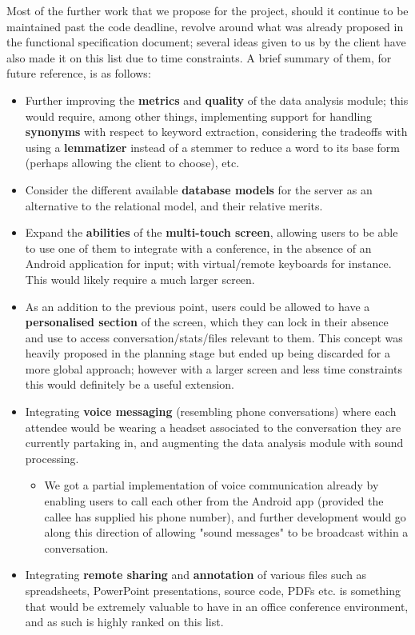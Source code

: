 \documentclass[12p, a4paper, onecolumn]{report}
\begin{document}
Most of the further work that we propose for the project, should it continue to be maintained past the code deadline, revolve around what was already proposed in the functional specification document; several ideas given to us by the client have also made it on this list due to time constraints. A brief summary of them, for future reference, is as follows:
\begin{itemize}
	\item Further improving the \textbf{metrics} and \textbf{quality} of the data analysis module; this would require, among other things, implementing support for handling \textbf{synonyms} with respect to keyword extraction, considering the tradeoffs with using a \textbf{lemmatizer} instead of a stemmer to reduce a word to its base form (perhaps allowing the client to choose), etc.
	\item Consider the different available \textbf{database models} for the server as an alternative to the relational model, and their relative merits.
	\item Expand the \textbf{abilities} of the \textbf{multi-touch screen}, allowing users to be able to use one of them to integrate with a conference, in the absence of an Android application for input; with virtual/remote keyboards for instance. This would likely require a much larger screen.
	\item As an addition to the previous point, users could be allowed to have a \textbf{personalised section} of the screen, which they can lock in their absence and use to access conversation/stats/files relevant to them. This concept was heavily proposed in the planning stage but ended up being discarded for a more global approach; however with a larger screen and less time constraints this would definitely be a useful extension.
	\item Integrating \textbf{voice messaging} (resembling phone conversations) where each attendee would be wearing a headset associated to the conversation they are currently partaking in, and augmenting the data analysis module with sound processing. 
	\begin{itemize}
		\item We got a partial implementation of voice communication already by enabling users to call each other from the Android app (provided the callee has supplied his phone number), and further development would go along this direction of allowing "sound messages" to be broadcast within a conversation.
	\end{itemize}
	\item Integrating \textbf{remote sharing} and \textbf{annotation} of various files such as spreadsheets, PowerPoint presentations, source code, PDFs etc. is something that would be extremely valuable to have in an office conference environment, and as such is highly ranked on this list.

\end{itemize}
\end{document}
